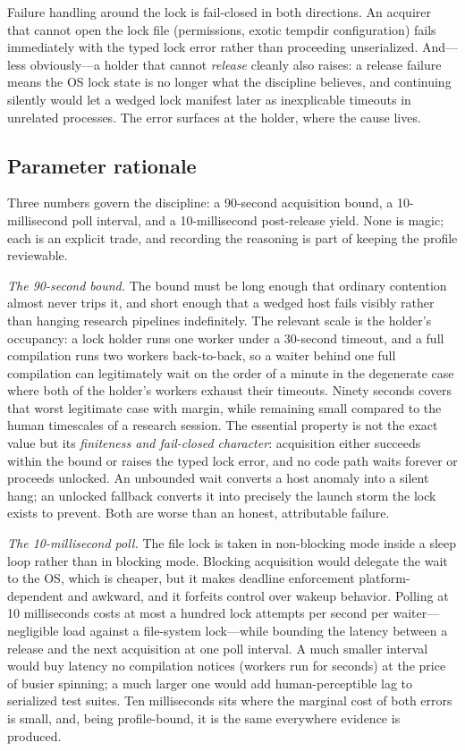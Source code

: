 Failure handling around the lock is fail-closed in both directions. An acquirer that cannot open the lock file (permissions, exotic tempdir configuration) fails immediately with the typed lock error rather than proceeding unserialized. And---less obviously---a holder that cannot \emph{release} cleanly also raises: a release failure means the OS lock state is no longer what the discipline believes, and continuing silently would let a wedged lock manifest later as inexplicable timeouts in unrelated processes. The error surfaces at the holder, where the cause lives.

\subsection{Parameter rationale}\label{ch08:parameters}

Three numbers govern the discipline: a 90-second acquisition bound, a 10-millisecond poll interval, and a 10-millisecond post-release yield. None is magic; each is an explicit trade, and recording the reasoning is part of keeping the profile reviewable.

\emph{The 90-second bound.} The bound must be long enough that ordinary contention almost never trips it, and short enough that a wedged host fails visibly rather than hanging research pipelines indefinitely. The relevant scale is the holder's occupancy: a lock holder runs one worker under a 30-second timeout, and a full compilation runs two workers back-to-back, so a waiter behind one full compilation can legitimately wait on the order of a minute in the degenerate case where both of the holder's workers exhaust their timeouts. Ninety seconds covers that worst legitimate case with margin, while remaining small compared to the human timescales of a research session. The essential property is not the exact value but its \emph{finiteness and fail-closed character}: acquisition either succeeds within the bound or raises the typed lock error, and no code path waits forever or proceeds unlocked. An unbounded wait converts a host anomaly into a silent hang; an unlocked fallback converts it into precisely the launch storm the lock exists to prevent. Both are worse than an honest, attributable failure.

\emph{The 10-millisecond poll.} The file lock is taken in non-blocking mode inside a sleep loop rather than in blocking mode. Blocking acquisition would delegate the wait to the OS, which is cheaper, but it makes deadline enforcement platform-dependent and awkward, and it forfeits control over wakeup behavior. Polling at 10 milliseconds costs at most a hundred lock attempts per second per waiter---negligible load against a file-system lock---while bounding the latency between a release and the next acquisition at one poll interval. A much smaller interval would buy latency no compilation notices (workers run for seconds) at the price of busier spinning; a much larger one would add human-perceptible lag to serialized test suites. Ten milliseconds sits where the marginal cost of both errors is small, and, being profile-bound, it is the same everywhere evidence is produced.

